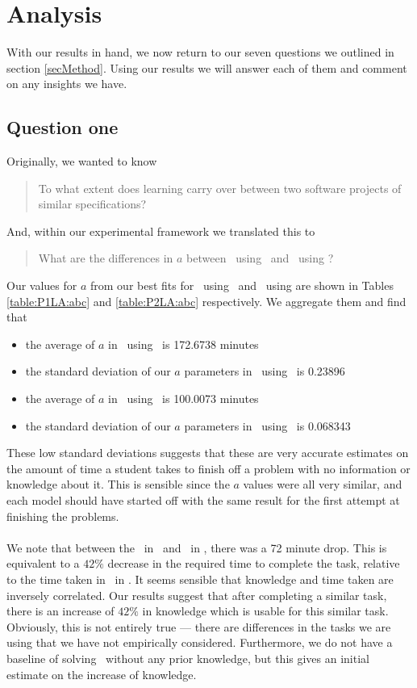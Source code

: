 \section{Analysis} \label{secAnalysis}

With our results in hand, we now return to our seven questions we outlined in
section \ref{secMethod}.
Using our results we will answer each of them and comment on any insights we
have.

\subsection{Question one}

Originally, we wanted to know
\begin{quote}
  To what extent does learning carry over between two software projects of similar
  specifications?
\end{quote}
And, within our experimental framework we translated this to 
\begin{quote}
  What are the differences in $a$ between \PO\ using \LA\ and \PT\ using \LA?
\end{quote}

Our values for $a$ from our best fits for \PO\ using \LA\ and \PT\ using \LA are
shown in Tables \ref{table:P1LA:abc} and \ref{table:P2LA:abc} respectively.
We aggregate them and find that
\begin{itemize}
  \item the average of $a$ in \PO\ using \LA\ is 172.6738 minutes
  \item the standard deviation of our $a$ parameters in \PO\ using \LA\ is 0.23896 
  \item the average of $a$ in \PT\ using \LA\ is 100.0073 minutes
  \item the standard deviation of our $a$ parameters in \PT\ using \LA\ is
  0.068343
\end{itemize}

These low standard deviations suggests that these are very accurate estimates on
the amount of time a student takes to finish off a problem with no information
or knowledge about it.
This is sensible since the $a$ values were all very similar, and each model
should have started off with the same result for the first attempt at finishing
the problems.\\
\\
We note that between the \PO\ in \LA\ and \PT\ in \LA, there was a 72 minute
drop.
This is equivalent to a $42\%$ decrease in the required time to complete the
task, relative to the time taken in \PO\ in \LA.
It seems sensible that knowledge and time taken are inversely correlated.
Our results suggest that after completing a similar task, there is an increase of
$42\%$ in knowledge which is usable for this similar task.
Obviously, this is not entirely true --- there are differences in the tasks we
are using that we have not empirically considered.
Furthermore, we do not have a baseline of solving \PT\ without any prior
knowledge, but this gives an initial estimate on the increase of knowledge.

